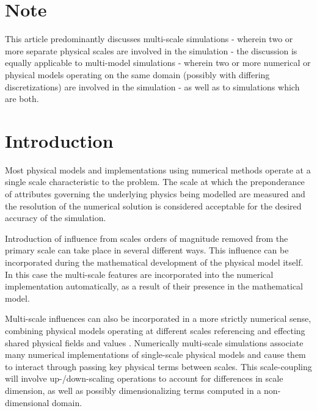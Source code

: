 \documentclass[11pt]{siamltex1213}
\begin{document}
\maketitle

\begin{abstract}
\end{abstract}

\section{Note}\label{note}
This article predominantly discusses multi-scale simulations - wherein two or more separate physical scales are involved in the simulation - the discussion is equally applicable to multi-model simulations - wherein two or more numerical or physical models operating on the same domain (possibly with differing discretizations) are involved in the simulation - as well as to simulations which are both.

\section{Introduction}\label{introduction}
\label{single_scale_simulations}
Most physical models and implementations using numerical methods operate at a single scale characteristic to the problem. The scale at which the preponderance of attributes governing the underlying physics being modelled are measured and the resolution of the numerical solution is considered acceptable for the desired accuracy of the simulation.

\label{multi_scale_simulations}
Introduction of influence from scales orders of magnitude removed from the primary scale can take place in several different ways. This influence can be incorporated during the mathematical development of the physical model itself. In this case the multi-scale features are incorporated into the numerical implementation automatically, as a result of their presence in the mathematical model. 

Multi-scale influences can also be incorporated in a more strictly numerical sense, combining physical models operating at different scales referencing and effecting shared physical fields and values \cite{shenoy97} \cite{weinan2003heterogenous}. Numerically multi-scale simulations associate many numerical implementations of single-scale physical models and cause them to interact through passing key physical terms between scales. This scale-coupling will involve up-/down-scaling operations to account for differences in scale dimension, as well as possibly dimensionalizing terms computed in a non-dimensional domain.
\end{document}
